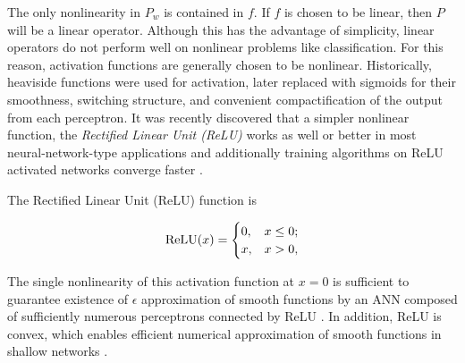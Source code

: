 The only nonlinearity in $P_w$ is contained in $f$. If $f$ is chosen to be linear, then $P$ will be a linear operator. Although this has the advantage of simplicity, linear operators do not perform well on nonlinear problems like classification. For this reason, activation functions are generally chosen to be nonlinear. Historically, heaviside functions were used for activation, later replaced with sigmoids \cite{malik1990preattentive} for their smoothness, switching structure, and convenient
compactification of the output from each perceptron.  It was recently discovered that a simpler nonlinear function, the \emph{Rectified Linear Unit (ReLU)} works as well or better in most neural-network-type applications \cite{glorot2011deep} and additionally training algorithms on ReLU activated networks converge faster \cite{nair_rectified_nodate}. 

\begin{definition}{The Rectified Linear Unit (ReLU) function is}
\label{relu}

  \[\text{ReLU}(x) = \begin{cases} 0, & x \leq 0;\\
      x, & x > 0,\end{cases}\]
\end{definition}


The single nonlinearity of this activation function
at $x = 0$ is sufficient to guarantee existence of $\epsilon$ approximation of smooth functions by an ANN composed of sufficiently numerous perceptrons connected by ReLU \cite{petersen2018optimal}. In addition, ReLU is convex, which enables efficient numerical approximation of smooth functions in shallow networks  \cite{li2017convergence}.  




